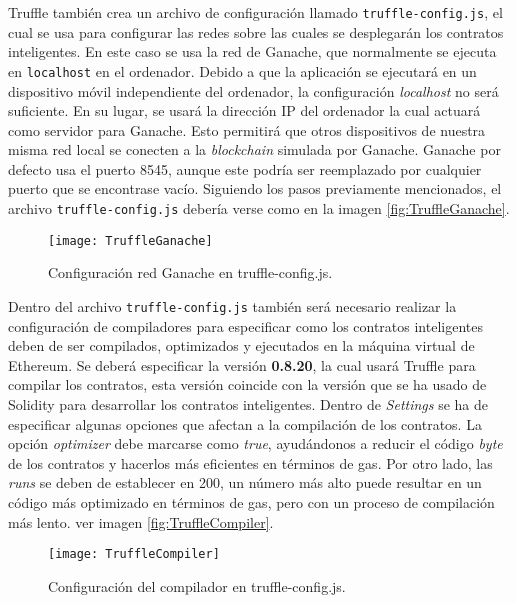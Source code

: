 \begin{enumerate}
Truffle también crea un archivo de configuración llamado \texttt{truffle-config.js}, el cual se usa para configurar las redes sobre las cuales se desplegarán los contratos inteligentes.
En este caso se usa la red de Ganache, que normalmente se ejecuta en \texttt{localhost} en el ordenador. Debido a que la aplicación se ejecutará en un dispositivo móvil independiente del ordenador, la configuración \textit{localhost} no será suficiente. 
En su lugar, se usará la dirección IP del ordenador la cual actuará como servidor para Ganache. Esto permitirá que otros dispositivos de nuestra misma red local se conecten a la \textit{blockchain} simulada por Ganache.
Ganache por defecto usa el puerto 8545, aunque este podría ser reemplazado por cualquier puerto que se encontrase vacío.
Siguiendo los pasos previamente mencionados, el archivo \texttt{truffle-config.js} debería verse como en la imagen \ref{fig:TruffleGanache}.

\begin{figure}[h]
	\label{img:TruffleGanache}
	\centering
	\texttt{[image: TruffleGanache]}
	\caption[Configuración Ganache Truffle]{Configuración red Ganache en truffle-config.js.}
\end{figure}

Dentro del archivo \texttt{truffle-config.js} también será necesario realizar la configuración de compiladores para especificar como los contratos inteligentes deben de ser compilados, optimizados y ejecutados en la máquina virtual de Ethereum.
Se deberá especificar la versión \textbf{0.8.20}, la cual usará Truffle para compilar los contratos, esta versión coincide con la versión que se ha usado de Solidity para desarrollar los contratos inteligentes.
Dentro de \textit{Settings} se ha de especificar algunas opciones que afectan a la compilación de los contratos. La opción \textit{optimizer} debe marcarse como \textit{true}, ayudándonos a reducir el código \textit{byte} de los contratos y hacerlos más eficientes en términos de gas.
Por otro lado, las \textit{runs} se deben de establecer en 200, un número más alto puede resultar en un código más optimizado en términos de gas, pero con un proceso de compilación más lento. ver imagen \ref{fig:TruffleCompiler}.

\begin{figure}[h]
	\label{img:TruffleCompiler}
	\centering
	\texttt{[image: TruffleCompiler]}
	\caption[Configuración compilador Truffle]{Configuración del compilador en truffle-config.js.}
\end{figure}


\end{enumerate}
